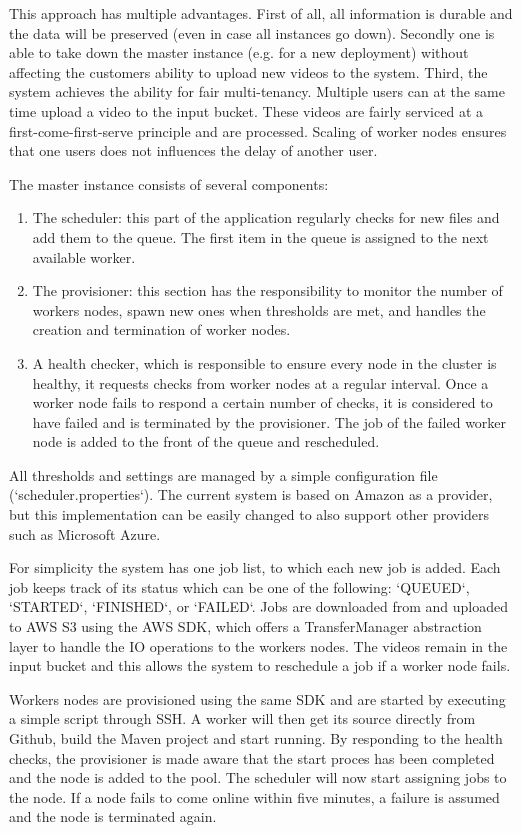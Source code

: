 \documentclass[a4paper]{IEEEtran}
\begin{document}
This approach has multiple advantages.
First of all, all information is durable and the data will be preserved (even in case all instances go down).
Secondly one is able to take down the master instance (e.g. for a new deployment) without affecting the customers ability to upload new videos to the system.
Third, the system achieves the ability for fair multi-tenancy.
Multiple users can at the same time upload a video to the input bucket.
These videos are fairly serviced at a first-come-first-serve principle
and are processed.
Scaling of worker nodes ensures that one users does not influences the delay of another user.

The master instance consists of several components:

\begin{enumerate}
\item
The scheduler:
this part of the application regularly checks for new files and add them to the queue.
The first item in the queue is assigned to the next available worker.
\item
The provisioner:
this section has the responsibility to monitor the number of workers nodes, spawn new ones when thresholds are met, and handles the creation and termination of worker nodes.
\item
A health checker, which is responsible to ensure every node in the cluster is healthy, it requests checks from worker nodes at a regular interval.
Once a worker node fails to respond a certain number of checks, it is considered to have failed and is terminated by the provisioner.
The job of the failed worker node is added to the front of the queue and rescheduled.
\end{enumerate}

All thresholds and settings are managed by a simple configuration file (`scheduler.properties`).
The current system is based on Amazon as a provider, but this implementation can be easily changed to also support other providers such as Microsoft Azure.

For simplicity the system has one job list, to which each new job is added.
Each job keeps track of its status which can be one of the following: `QUEUED`, `STARTED`, `FINISHED`, or `FAILED`.
Jobs are downloaded from and uploaded to AWS S3 using the AWS SDK, which offers a TransferManager abstraction layer to handle the IO operations to the workers nodes.
The videos remain in the input bucket and this allows the system to reschedule a job if a worker node fails.

Workers nodes are provisioned using the same SDK and are started by executing a simple script through SSH.
A worker will then get its source directly from Github, build the Maven project and start running.
By responding to the health checks, the provisioner is made aware that the start proces has been completed and the node is added to the pool. 
The scheduler will now start assigning jobs to the node.
If a node fails to come online within five minutes, a failure is assumed and the node is terminated again.
\end{document}
